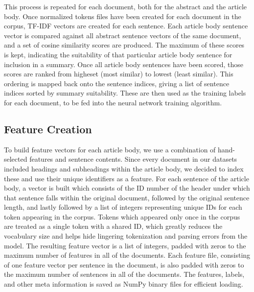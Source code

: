 \documentclass[11pt]{article}
\begin{document}
	This process is repeated for each document, both for the abstract and the article body. Once normalized tokens files have been created for each document in the corpus, TF-IDF vectors are created for each sentence. Each article body sentence vector is compared against all abstract sentence vectors of the same document, and a set of cosine similarity scores are produced. The maximum of these scores is kept, indicating the suitability of that particular article body sentence for inclusion in a summary. Once all article body sentences have been scored, those scores are ranked from higheset (most similar) to lowest (least similar). This ordering is mapped back onto the sentence indices, giving a list of sentence indices sorted by summary suitability. These are then used as the training labels for each document, to be fed into the neural network training algorithm.
	
	\subsection{Feature Creation}	
	To build feature vectors for each article body, we use a combination of hand-selected features and sentence contents. Since every document in our datasets included headings and subheadings within the article body, we decided to index these and use their unique identifiers as a feature. For each sentence of the article body, a vector is built which consists of the ID number of the header under which that sentence falls within the original document, followed by the original sentence length, and lastly followed by a list of integers representing unique IDs for each token appearing in the corpus. Tokens which appeared only once in the corpus are treated as a single token with a shared ID, which greatly reduces the vocabulary size and helps hide lingering tokenization and parsing errors from the model. The resulting feature vector is a list of integers, padded with zeros to the maximum number of features in all of the documents. Each feature file, consisting of one feature vector per sentence in the document, is also padded with zeros to the maximum number of sentences in all of the documents. The features, labels, and other meta information is saved as NumPy binary files for efficient loading.
	
\end{document}
